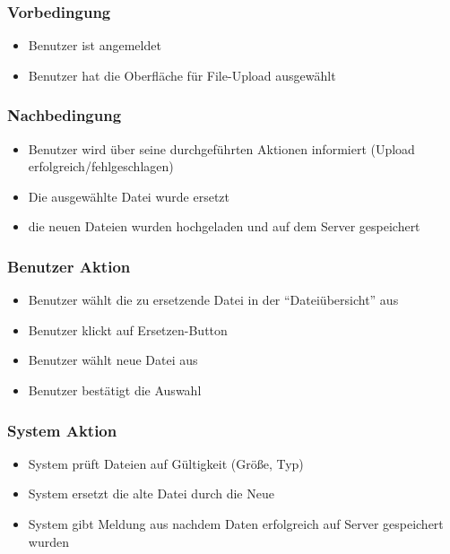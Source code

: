 \documentclass[a4paper,12pt]{article}
\begin{document}
\subsubsection{Vorbedingung}\label{vorbedingung-12}

\begin{itemize}

\item
  Benutzer ist angemeldet
\item
  Benutzer hat die Oberfläche für File-Upload ausgewählt
\end{itemize}

\subsubsection{Nachbedingung}\label{nachbedingung-12}

\begin{itemize}

\item
  Benutzer wird über seine durchgeführten Aktionen informiert (Upload
  erfolgreich/fehlgeschlagen)
\item
  Die ausgewählte Datei wurde ersetzt
\item
  die neuen Dateien wurden hochgeladen und auf dem Server gespeichert
\end{itemize}

\subsubsection{Benutzer Aktion}\label{benutzer-aktion-12}

\begin{itemize}

\item
  Benutzer wählt die zu ersetzende Datei in der ``Dateiübersicht'' aus
\item
  Benutzer klickt auf Ersetzen-Button
\item
  Benutzer wählt neue Datei aus
\item
  Benutzer bestätigt die Auswahl
\end{itemize}

\subsubsection{System Aktion}\label{system-aktion-12}

\begin{itemize}

\item
  System prüft Dateien auf Gültigkeit (Größe, Typ)
\item
  System ersetzt die alte Datei durch die Neue
\item
  System gibt Meldung aus nachdem Daten erfolgreich auf Server
  gespeichert wurden
\end{itemize}
\end{document}
